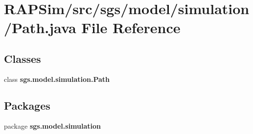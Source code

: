 \section{R\-A\-P\-Sim/src/sgs/model/simulation/\-Path.java File Reference}
\label{_path_8java}
\subsection*{Classes}
\begin{DoxyCompactItemize}
\item 
class {\bf sgs.\-model.\-simulation.\-Path}
\end{DoxyCompactItemize}
\subsection*{Packages}
\begin{DoxyCompactItemize}
\item 
package {\bf sgs.\-model.\-simulation}
\end{DoxyCompactItemize}
